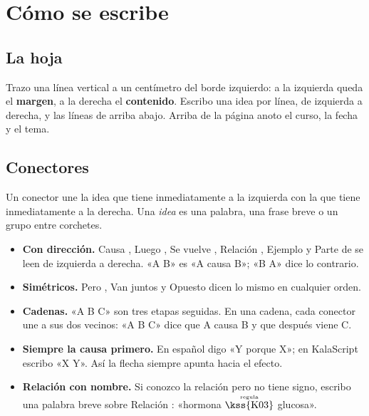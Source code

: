 \section{Cómo se escribe}\label{sec:reglas}

\subsection{La hoja}
Trazo una línea vertical a un centímetro del borde izquierdo: a la izquierda
queda el \textbf{margen}, a la derecha el \textbf{contenido}. Escribo una idea
por línea, de izquierda a derecha, y las líneas de arriba abajo. Arriba de la
página anoto el curso, la fecha y el tema.

\begin{apunte}
\end{apunte}

\subsection{Conectores}
Un conector une la idea que tiene inmediatamente a la izquierda con la que
tiene inmediatamente a la derecha. Una \emph{idea} es una palabra, una frase
breve o un grupo entre corchetes.

\begin{itemize}
\item \textbf{Con dirección.} Causa , Luego , Se vuelve
 , Relación , Ejemplo  y Parte de  se leen
 de izquierda a derecha. «A  B» es «A causa B»; «B  A» dice
 lo contrario.
\item \textbf{Simétricos.} Pero , Van juntos  y Opuesto
  dicen lo mismo en cualquier orden.
\item \textbf{Cadenas.} «A  B  C» son tres etapas seguidas.
 En una cadena, cada conector une a sus dos vecinos: «A  B  C»
 dice que A causa B y que después viene C.
\item \textbf{Siempre la causa primero.} En español digo «Y porque X»; en
 KalaScript escribo «X  Y». Así la flecha siempre apunta hacia el efecto.
\item \textbf{Relación con nombre.} Si conozco la relación pero no tiene signo,
 escribo una palabra breve sobre Relación : «hormona
 \(\overset{\text{\tiny regula}}{\text{\kss{K03}}}\) glucosa».
\end{itemize}


